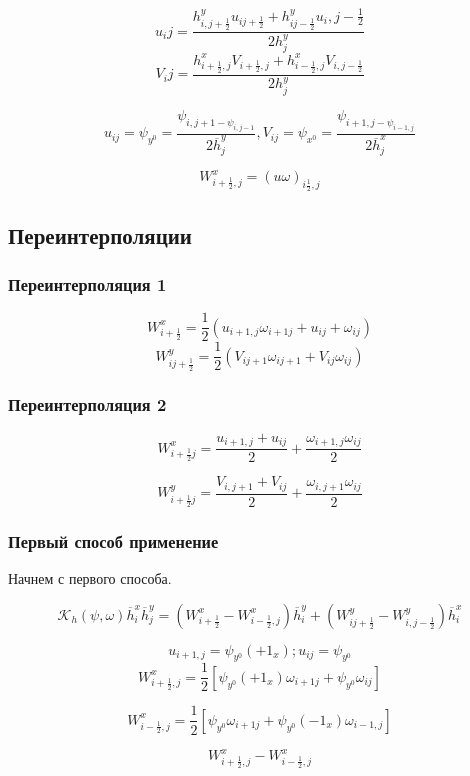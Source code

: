 \documentclass[12pt, a4paper]{article}
\begin{document}
\[ u_ij = \frac{h^y_{i, j+\frac{1}{2}} u_{ij+\frac{1}{2}} + h^y_{ij-\frac{1}{2}} u_i, j-\frac{1}{2}}{2h^y_j} \]
\[ V_ij = \frac{h^x_{i+\frac{1}{2}, j} V_{i+\frac{1}{2},j} + h^x_{i-\frac{1}{2}, j} V_{i, j-\frac{1}{2}}}{2h^y_j} \]

\[ u_{ij} = \psi_{y^0}= \frac{\psi_{i, j+1 - \psi_{i, j-1}}}{2 \overline{h}^y_j}, V_{ij} = \psi_{x^0}= \frac{\psi_{i+1, j - \psi_{i-1, j}}}{2 \overline{h}^x_j} \]

\[ W^x_{i+\frac{1}{2}, j} = {(u \omega)}_{i\frac{1}{2}, j} \]

\subsection{Переинтерполяции}
\subsubsection{Переинтерполяция 1}

\[ W^x_{i+\frac{1}{2}} = \frac{1}{2} (u_{i+1, j} \omega _{i+1j} + u_{ij} + \omega_{ij}) \]
\[ W^y_{ij+\frac{1}{2}} = \frac{1}{2} (V_{ij+1} \omega_{ij+1} + V_{ij} \omega_{ij}) \]

\subsubsection{Переинтерполяция 2}

\[ W^x_{i+\frac{1}{2}j} = \frac{u_{i+1, j}+u_{ij}}{2} + \frac{\omega_{i+1,j}\omega_{ij}}{2} \]

\[ W^y_{i+\frac{1}{2}j} = \frac{V_{i,j+1}+V_{ij}}{2} + \frac{\omega_{i,j+1}\omega_{ij}}{2} \]

\subsubsection{Первый способ применение}
Начнем с первого способа.

\[ \mathcal{K}_h(\psi, \omega) \overline{h}^x_i \overline{h}^y_j = (W^x_{i+\frac{1}{2}} - W^x_{i-\frac{1}{2}, j}) \overline{h}^y_i + (W^y_{ij+\frac{1}{2}} - W^y_{i,j-\frac{1}{2}}) \overline{h}^x_i \]

\[ u_{i+1,j} = \psi_{y^0}(+1_x); u_{ij} = \psi_{y^0} \]
\[ W^x_{i+\frac{1}{2}, j} =  \frac{1}{2}[\psi_{y^0} (+1_x) \omega_{i+1j} + \psi_{y^0} \omega_{ij}] \]

\[ W^x_{i-\frac{1}{2}, j} = \frac{1}{2}[\psi_{y^0} \omega_{i+1j} + \psi_{y^0}(-1_x) \omega_{i-1, j}] \]

\[ W^x_{i+\frac{1}{2}, j} - W^x_{i-\frac{1}{2}, j} \]
\end{document}
